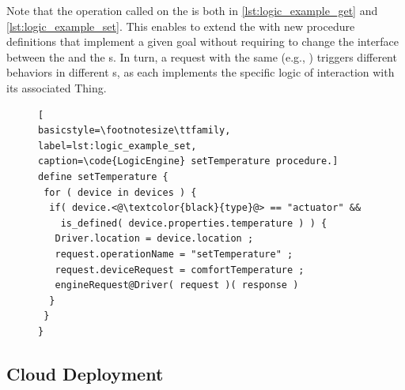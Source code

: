 Note that the operation called on the  is 
both in \cref{lst:logic_example_get} and \cref{lst:logic_example_set}. This
enables to extend the  with new procedure definitions that
implement a given goal without requiring to change the interface between the
 and the s. In turn, a request with the same
 (e.g., ) triggers different
behaviors in different s, as each implements the specific logic
of interaction with its associated Thing.
%
\begin{figure}[t]
\begin{lstlisting}[
basicstyle=\footnotesize\ttfamily,
label=lst:logic_example_set,
caption=\code{LogicEngine} setTemperature procedure.]
define setTemperature {
 for ( device in devices ) {
  if( device.<@\textcolor{black}{type}@> == "actuator" &&
    is_defined( device.properties.temperature ) ) {
   Driver.location = device.location ;
   request.operationName = "setTemperature" ;
   request.deviceRequest = comfortTemperature ;
   engineRequest@Driver( request )( response )
  }
 }
}
\end{lstlisting}
\end{figure}


\subsection{Cloud Deployment}

